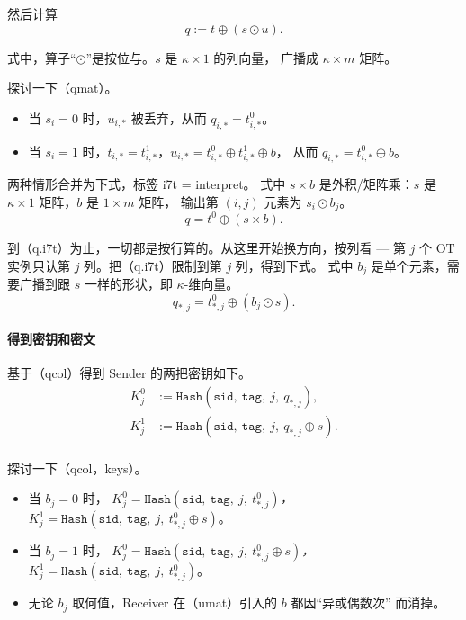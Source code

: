 然后计算
\begin{equation}\label{eq:01-iknp03:qmat}
{q} := {t} \oplus \left(s\odot {u}\right). \tag{qmat}
\end{equation}

式中，算子“$\odot$”是按位与。$s$ 是 $\kappa\times 1$ 的列向量，
广播成 $\kappa \times m$ 矩阵。

探讨一下（qmat）。

\begin{itemize}

\item
  当 $s_i = 0$ 时，$u_{i,*}$ 被丢弃，从而 $q_{i,*}=t_{i,*}^0$。
\item
  当 $s_i=1$ 时，$t_{i,*}=t_{i,*}^1$，$u_{i,*}=t_{i,*}^0\oplus t_{i,*}^1\oplus b$，
  从而 $q_{i,*}=t_{i,*}^0\oplus b$。
\end{itemize}

两种情形合并为下式，标签 i7t = interpret。
式中 $s\times b$ 是外积/矩阵乘：$s$ 是 $\kappa\times 1$ 矩阵，$b$ 是 $1\times m$ 矩阵，
输出第 $(i,j)$ 元素为 $s_i \odot b_j$。
\begin{equation}\label{eq:01-iknp03:q-i7t}
q = {t}^0\oplus(s\times{b}). \tag{q.i7t}
\end{equation}

到（q.i7t）为止，一切都是按行算的。从这里开始换方向，按列看 ---
第 $j$ 个 OT 实例只认第 $j$ 列。把（q.i7t）限制到第 $j$ 列，得到下式。
式中 $b_j$ 是单个元素，需要广播到跟 $s$ 一样的形状，即 $\kappa$-维向量。
\begin{equation}\label{eq:01-iknp03:qcol}
q_{*,j}=t^0_{*,j}\oplus \left(b_j \odot s\right). \tag{qcol}
\end{equation}

\paragraph{得到密钥和密文}基于（qcol）得到 Sender 的两把密钥如下。
\begin{align}K^0_j &:= \mathtt{Hash}\left(
    \mathtt{sid},~\mathtt{tag},~j,~q_{*,j}\right
), \\
K^1_j &:= \mathtt{Hash}\left(
    \mathtt{sid},~\mathtt{tag},~j,~q_{*,j}\oplus s\right
). \tag{keys} \\
\end{align}

探讨一下（qcol，keys）。

\begin{itemize}

\item
  当 $b_j=0$ 时，
  \emph{$K^0_j=\mathtt{Hash}\left(\mathtt{sid},~\mathtt{tag},~j,~t^0_{*,j}\right)$，
  }$K^1_j=\mathtt{Hash}\left(\mathtt{sid},~\mathtt{tag},~j,~t^0_{*,j}\oplus s\right)$。
\item
  当 $b_j=1$ 时，
  \emph{$K^0_j=\mathtt{Hash}\left(\mathtt{sid},~\mathtt{tag},~j,~t^0_{*,j}\oplus s\right)$，
  }$K^1_j=\mathtt{Hash}\left(\mathtt{sid},~\mathtt{tag},~j,~t^0_{*,j}\right)$。
\item
  无论 $b_j$ 取何值，Receiver 在（umat）引入的 $b$ 都因“异或偶数次”
  而消掉。
\end{itemize}

